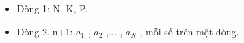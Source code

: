 \begin{itemize}
	\item     Dòng 1: N, K, P.   
	\item     Dòng 2..n+1: $a_{1}$    , $a_{2}$    ,... , $a_{N}$    , mỗi số trên một dòng.   
\end{itemize}